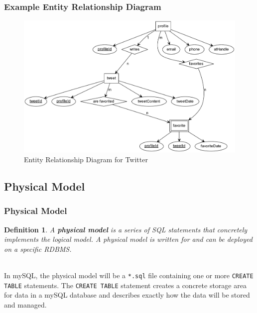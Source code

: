 \documentclass[aspectratio=169]{beamer}
\newtheorem{defn}{Definition}
\begin{document}
\begin{frame}
\frametitle{Example Entity Relationship Diagram}
\begin{figure}
\includegraphics[scale=0.333333333]{../artifacts/twitter-erd.pdf}
\caption{Entity Relationship Diagram for Twitter}
\label{fig:erd}
\end{figure}
\end{frame}

\subsection{Physical Model}
\begin{frame}
\frametitle{Physical Model}
\begin{defn}
A \textbf{physical model} is a series of SQL statements that concretely implements the logical model. A physical model is written for and can be deployed on a specific RDBMS.
\end{defn}
\pause
\mbox{}\\
In mySQL, the physical model will be a \texttt{*.sql} file containing one or more \texttt{CREATE TABLE} statements. The \texttt{CREATE TABLE} statement creates a concrete storage area for data in a mySQL database and describes exactly how the data will be stored and managed.
\end{frame}
\end{document}
